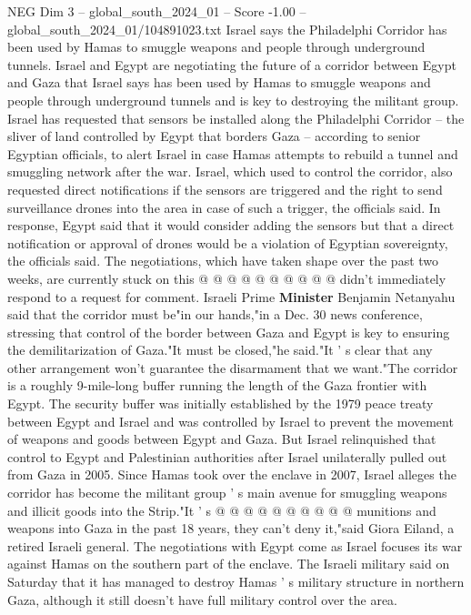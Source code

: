\begin{textsample}{NEG Dim 3 – global\_south\_2024\_01 – Score -1.00 – global\_south\_2024\_01/104891023.txt}  \label{ex:f3_neg_079}
Israel says the Philadelphi Corridor has been used by Hamas to smuggle weapons and people through underground tunnels.
Israel and Egypt are negotiating the future of a corridor between Egypt and Gaza that Israel says has been used by Hamas to smuggle weapons and people through underground tunnels and is key to destroying the militant group.
Israel has requested that sensors be installed along the Philadelphi Corridor -- the sliver of land controlled by Egypt that borders Gaza -- according to senior Egyptian officials, to alert Israel in case Hamas attempts to rebuild a tunnel and smuggling network after the war.
Israel, which used to control the corridor, also requested direct notifications if the sensors are triggered and the right to send surveillance drones into the area in case of such a trigger, the officials said.
In response, Egypt said that it would consider adding the sensors but that a direct notification or approval of drones would be a violation of Egyptian sovereignty, the officials said.
The negotiations, which have taken shape over the past two weeks, are currently stuck on this @ @ @ @ @ @ @ @ @ @ didn't immediately respond to a request for comment.
Israeli Prime \textbf{Minister} Benjamin Netanyahu said that the corridor must be"in our hands,"in a Dec. 30 news conference, stressing that control of the border between Gaza and Egypt is key to ensuring the demilitarization of Gaza."It must be closed,"he said."It ' s clear that any other arrangement won't guarantee the disarmament that we want."The corridor is a roughly 9-mile-long buffer running the length of the Gaza frontier with Egypt.
The security buffer was initially established by the 1979 peace treaty between Egypt and Israel and was controlled by Israel to prevent the movement of weapons and goods between Egypt and Gaza.
But Israel relinquished that control to Egypt and Palestinian authorities after Israel unilaterally pulled out from Gaza in 2005.
Since Hamas took over the enclave in 2007, Israel alleges the corridor has become the militant group ' s main avenue for smuggling weapons and illicit goods into the Strip."It ' s @ @ @ @ @ @ @ @ @ @ munitions and weapons into Gaza in the past 18 years, they can't deny it,"said Giora Eiland, a retired Israeli general.
The negotiations with Egypt come as Israel focuses its war against Hamas on the southern part of the enclave.
The Israeli military said on Saturday that it has managed to destroy Hamas ' s military structure in northern Gaza, although it still doesn't have full military control over the area.

\end{textsample}
